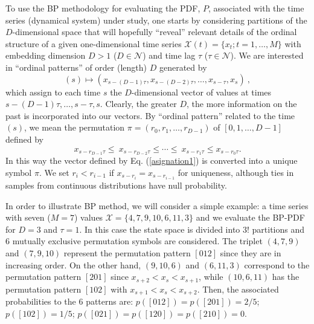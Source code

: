 To use the BP methodology\cite{Bandt2002} for evaluating the PDF, $P$, associated with the time 
series (dynamical system) under study, one starts by considering partitions of the $D$-dimensional space that 
will hopefully ``reveal'' relevant details of the ordinal structure of a given one-dimensional time series 
${\mathcal X}(t) = \{ x_t; t = 1, \ldots, M\}$ with embedding dimension $D > 1$ ($D \in {\mathcal N}$) 
and time lag $\tau$ ($\tau \in {\mathcal N}$).
We are interested in ``ordinal patterns'' of order (length) $D$ generated by
\begin{equation}
\label{asignation1}
(s)\mapsto \left(x_{s-(D-1)\tau},x_{s-(D-2)\tau},\ldots, x_{s-\tau},x_{s}\right) \ ,
\end{equation}
which assign to each time $s$ the $D$-dimensional vector of values at times $s-(D-1)\tau,\ldots,s-\tau,s$.
Clearly, the greater $D$, the more information on the past is incorporated into our vectors.
By ``ordinal pattern'' related to the time $(s)$, we mean the permutation $\pi=(r_0,r_1, \ldots,r_{D-1})$ 
of $[0,1,\ldots,D-1]$ defined by 
\begin{equation}
\label{asignation2}
x_{s-r_{D-1}\tau} \le~x_{s-r_{D-2}\tau} \le \cdots \le~x_{s-r_{1}\tau} \le x_{s-r_0\tau}  .
\end{equation}
In this way the vector defined by Eq. (\ref{asignation1}) is converted into a unique symbol $\pi$.
We set $r_i < r_{i-1}$ if $x_{s-r_{i}} = x_{s-r_{i-1}}$ for uniqueness, although ties in samples from 
continuous distributions have null probability.

In order to illustrate BP method, we will consider  a simple example: a time series with seven 
($M=7$) values ${\mathcal X} = \{4, 7, 9, 10, 6, 11, 3\}$ and we evaluate the BP-PDF for $D=3$ and $\tau=1$.
In this case the state space is divided into $3!$ partitions and $6$ mutually exclusive permutation symbols 
are considered.
The triplet $(4, 7, 9)$ and $(7, 9, 10)$ represent the permutation pattern $[012]$ since they are in 
increasing order.
On the other hand, $(9, 10, 6)$ and $(6, 11, 3)$ correspond to the permutation pattern $[201]$ since 
$x_{s+2} < x_s < x_{s+1}$, while $(10, 6, 11)$ has the permutation pattern  $[102]$ with 
$x_{s+1} < x_s < x_{s+2}$.
Then, the associated probabilities to the $6$ patterns are:
$p([012]) = p([201]) = 2/5$; $p([102]) = 1/5$; $p([021]) = p([120]) = p([210])=0$.

